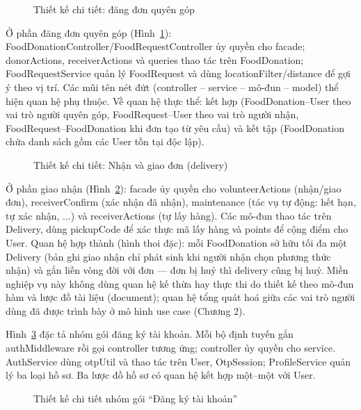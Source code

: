\documentclass[../main.tex]{subfiles}%
\begin{document}
\begin{figure}[H]
    \centering
    \caption{Thiết kế chi tiết: đăng đơn quyên góp}
    \label{fig:pkg_donation}
\end{figure}

Ở phần đăng đơn quyên góp (Hình~\ref{fig:pkg_donation}): FoodDonationController/FoodRequestController ủy quyền cho facade; donorActions, receiverActions và queries thao tác trên FoodDonation; FoodRequestService quản lý FoodRequest và dùng locationFilter/distance để gợi ý theo vị trí. Các mũi tên nét đứt (controller -- service -- mô-đun -- model) thể hiện quan hệ phụ thuộc. Về quan hệ thực thể: kết hợp (FoodDonation--User theo vai trò người quyên góp, FoodRequest--User theo vai trò người nhận, FoodRequest--FoodDonation khi đơn tạo từ yêu cầu) và kết tập (FoodDonation chứa danh sách gồm các User tồn tại độc lập).

\begin{figure}[H]
    \centering
    \caption{Thiết kế chi tiết: Nhận và giao đơn (delivery)}
    \label{fig:pkg_delivery}
\end{figure}

Ở phần giao nhận (Hình~\ref{fig:pkg_delivery}): facade ủy quyền cho volunteerActions (nhận/giao đơn), receiverConfirm (xác nhận đã nhận), maintenance (tác vụ tự động: hết hạn, tự xác nhận, ...) và receiverActions (tự lấy hàng). Các mô-đun thao tác trên Delivery, dùng pickupCode để xác thực mã lấy hàng và points để cộng điểm cho User. Quan hệ hợp thành (hình thoi đặc): mỗi FoodDonation sở hữu tối đa một Delivery (bản ghi giao nhận chỉ phát sinh khi người nhận chọn phương thức nhận) và gắn liền vòng đời với đơn --- đơn bị huỷ thì delivery cũng bị huỷ. Miền nghiệp vụ này không dùng quan hệ kế thừa hay thực thi do thiết kế theo mô-đun hàm và lược đồ tài liệu (document); quan hệ tổng quát hoá giữa các vai trò người dùng đã được trình bày ở mô hình use case (Chương 2).

Hình~\ref{fig:pkg_auth} đặc tả nhóm gói đăng ký tài khoản. Mỗi bộ định tuyến gắn authMiddleware rồi gọi controller tương ứng; controller ủy quyền cho service. AuthService dùng otpUtil và thao tác trên User, OtpSession; ProfileService quản lý ba loại hồ sơ. Ba lược đồ hồ sơ có quan hệ kết hợp một--một với User.

\begin{figure}[H]
    \centering
    \caption{Thiết kế chi tiết nhóm gói ``Đăng ký tài khoản''}
    \label{fig:pkg_auth}
\end{figure}
\end{document}
